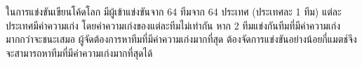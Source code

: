\question ในการแข่งขันเขียนโค้ดโลก มีผู้เข้าแข่งขันจาก 64 ทีมจาก 64 ประเทศ (ประเทศละ 1 ทีม) แต่ละประเทศมีค่าความเก่ง โดยค่าความเก่งของแต่ละทีมไม่เท่ากัน หาก 2 ทีมแข่งกันทีมที่มีค่าความเก่งมากกว่าจะชนะเสมอ ผู้จัดต้องการหาทีมที่มีค่าความเก่งมากที่สุด ต้องจัดการแข่งขันอย่างน้อยกี่แมตช์จึงจะสามารถหาทีมที่มีค่าความเก่งมากที่สุดได้
\newline
{}
